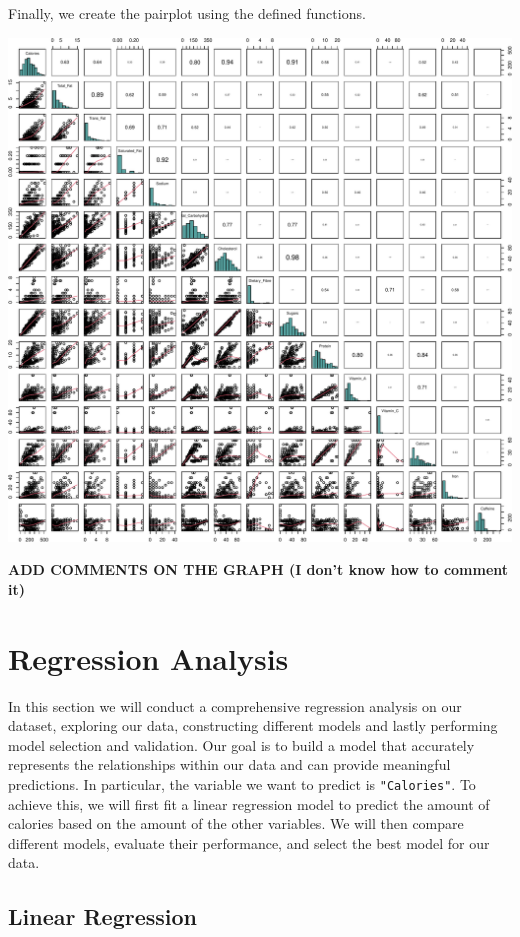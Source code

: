 \documentclass[
]{article}
\begin{document}
Finally, we create the pairplot using the defined functions.

\begin{center}\includegraphics{Statistical_Learning_Final_Report_files/figure-latex/pairplot-1} \end{center}

\textbf{ADD COMMENTS ON THE GRAPH (I don't know how to comment it)}

\section{Regression Analysis}\label{regression-analysis}

In this section we will conduct a comprehensive regression analysis on
our dataset, exploring our data, constructing different models and
lastly performing model selection and validation. Our goal is to build a
model that accurately represents the relationships within our data and
can provide meaningful predictions. In particular, the variable we want
to predict is \texttt{"Calories"}. To achieve this, we will first fit a
linear regression model to predict the amount of calories based on the
amount of the other variables. We will then compare different models,
evaluate their performance, and select the best model for our data.

\subsection{Linear Regression}\label{linear-regression}
\end{document}
